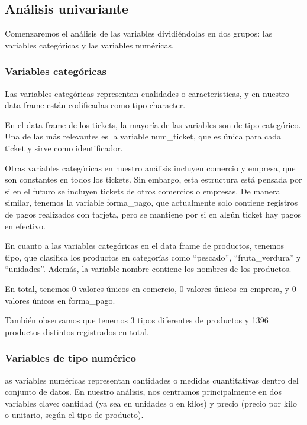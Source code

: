 \documentclass[,article,submit,moreauthors,pdftex]{Definitions/mdpi}
\begin{document}
\hypertarget{anuxe1lisis-univariante}{%
\subsection{Análisis univariante}\label{anuxe1lisis-univariante}}

Comenzaremos el análisis de las variables dividiéndolas en dos grupos:
las variables categóricas y las variables numéricas.

\hypertarget{variables-categuxf3ricas}{%
\subsubsection{Variables categóricas}\label{variables-categuxf3ricas}}

Las variables categóricas representan cualidades o características, y en
nuestro data frame están codificadas como tipo character.

En el data frame de los tickets, la mayoría de las variables son de tipo
categórico. Una de las más relevantes es la variable num\_ticket, que es
única para cada ticket y sirve como identificador.

Otras variables categóricas en nuestro análisis incluyen comercio y
empresa, que son constantes en todos los tickets. Sin embargo, esta
estructura está pensada por si en el futuro se incluyen tickets de otros
comercios o empresas. De manera similar, tenemos la variable
forma\_pago, que actualmente solo contiene registros de pagos realizados
con tarjeta, pero se mantiene por si en algún ticket hay pagos en
efectivo.

En cuanto a las variables categóricas en el data frame de productos,
tenemos tipo, que clasifica los productos en categorías como
``pescado'', ``fruta\_verdura'' y ``unidades''. Además, la variable
nombre contiene los nombres de los productos.

En total, tenemos 0 valores únicos en comercio, 0 valores únicos en
empresa, y 0 valores únicos en forma\_pago.

También observamos que tenemos 3 tipos diferentes de productos y 1396
productos distintos registrados en total.

\hypertarget{variables-de-tipo-numuxe9rico}{%
\subsubsection{Variables de tipo
numérico}\label{variables-de-tipo-numuxe9rico}}

as variables numéricas representan cantidades o medidas cuantitativas
dentro del conjunto de datos. En nuestro análisis, nos centramos
principalmente en dos variables clave: cantidad (ya sea en unidades o en
kilos) y precio (precio por kilo o unitario, según el tipo de producto).
\end{document}
